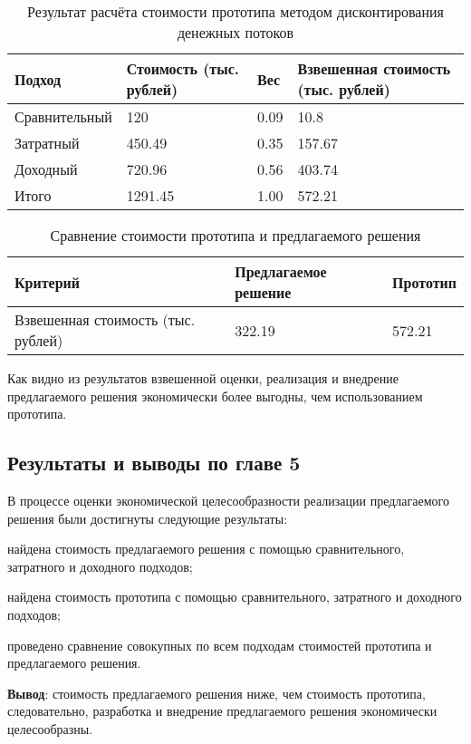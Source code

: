 \begin{table}[H]
\centering
\caption{Результат расчёта стоимости прототипа методом дисконтирования денежных потоков}
{\small 
\begin{tabu}to \textwidth{ | X[c] | X[c] | X[c] | X[c] | }
	\hline
	Подход & Стоимость (тыс. рублей) & Вес & Взвешенная стоимость (тыс. рублей) \\
	\hline
	Сравнительный & 120 & 0.09 & 10.8 \\
	\hline
	Затратный & 450.49 & 0.35 & 157.67 \\
	\hline
	Доходный & 720.96 & 0.56 & 403.74 \\
	\hline
	Итого & 1291.45 & 1.00 & 572.21 \\
	\hline
\end{tabu}
}
\label{tab:balance1}
\end{table} 

\begin{table}[H]
\centering
\caption{Сравнение стоимости прототипа и предлагаемого решения}
{\small 
\begin{tabu}to \textwidth{ | X[c] | X[c] | X[c] |}
	\hline
	Критерий & Предлагаемое решение & Прототип \\ \hline
	Взвешенная стоимость (тыс. рублей) & 322.19 & 572.21 \\ \hline
\end{tabu}
}
\label{tab:balances}
\end{table} 

Как видно из результатов взвешенной оценки, реализация и внедрение предлагаемого решения экономически более выгодны, чем использованием прототипа.

\subsection{Результаты и выводы по главе 5}

В процессе оценки экономической целесообразности реализации предлагаемого решения были достигнуты следующие результаты:
\begin{list}{}{\leftmargin=1.5cm}
	\item найдена стоимость предлагаемого решения с помощью сравнительного, затратного и доходного подходов;
	\item найдена стоимость прототипа с помощью сравнительного, затратного и доходного подходов;
	\item проведено сравнение совокупных по всем подходам стоимостей прототипа и предлагаемого решения.
\end{list}

\textbf{Вывод}: стоимость предлагаемого решения ниже, чем стоимость прототипа, следовательно, разработка и внедрение предлагаемого решения экономически целесообразны.